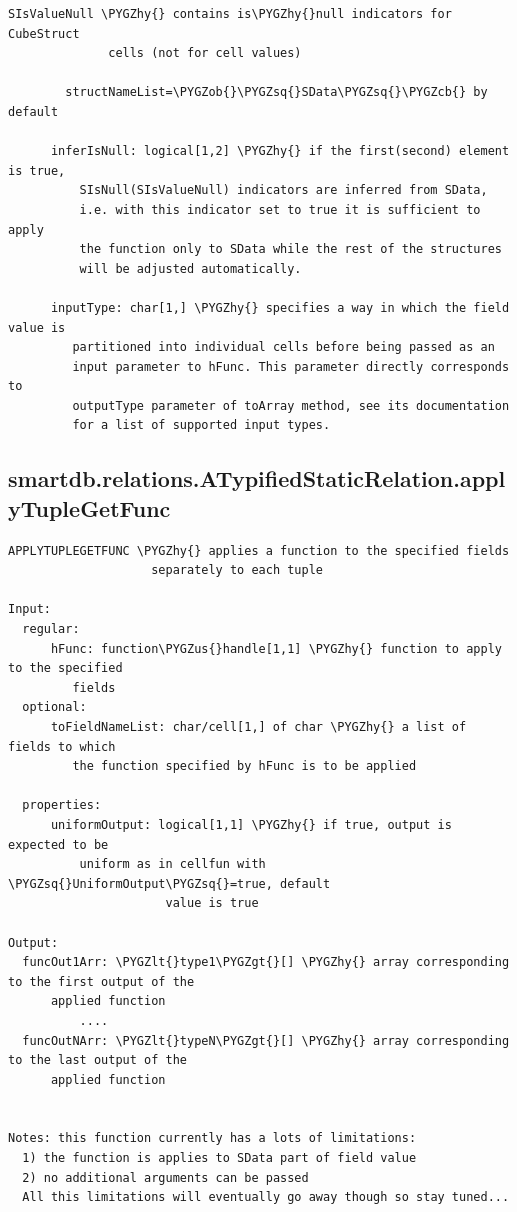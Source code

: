 \documentclass[letterpaper,10pt,english]{sphinxmanual}
\def\PYGZus{\char`\_}
\def\PYGZob{\char`\{}
\def\PYGZcb{\char`\}}
\def\PYGZlt{\char`\<}
\def\PYGZgt{\char`\>}
\def\PYGZhy{\char`\-}
\def\PYGZsq{\char`\'}
\begin{document}
\begin{Verbatim}[commandchars=\\\{\}]
           SIsValueNull \PYGZhy{} contains is\PYGZhy{}null indicators for CubeStruct
              cells (not for cell values)

        structNameList=\PYGZob{}\PYGZsq{}SData\PYGZsq{}\PYGZcb{} by default

      inferIsNull: logical[1,2] \PYGZhy{} if the first(second) element is true,
          SIsNull(SIsValueNull) indicators are inferred from SData,
          i.e. with this indicator set to true it is sufficient to apply
          the function only to SData while the rest of the structures
          will be adjusted automatically.

      inputType: char[1,] \PYGZhy{} specifies a way in which the field value is
         partitioned into individual cells before being passed as an
         input parameter to hFunc. This parameter directly corresponds to
         outputType parameter of toArray method, see its documentation
         for a list of supported input types.
\end{Verbatim}


\subsection{smartdb.relations.ATypifiedStaticRelation.applyTupleGetFunc}
\label{chap_functions:smartdb-relations-atypifiedstaticrelation-applytuplegetfunc}
\begin{Verbatim}[commandchars=\\\{\}]
APPLYTUPLEGETFUNC \PYGZhy{} applies a function to the specified fields
                    separately to each tuple

Input:
  regular:
      hFunc: function\PYGZus{}handle[1,1] \PYGZhy{} function to apply to the specified
         fields
  optional:
      toFieldNameList: char/cell[1,] of char \PYGZhy{} a list of fields to which
         the function specified by hFunc is to be applied

  properties:
      uniformOutput: logical[1,1] \PYGZhy{} if true, output is expected to be
          uniform as in cellfun with \PYGZsq{}UniformOutput\PYGZsq{}=true, default
                      value is true

Output:
  funcOut1Arr: \PYGZlt{}type1\PYGZgt{}[] \PYGZhy{} array corresponding to the first output of the
      applied function
          ....
  funcOutNArr: \PYGZlt{}typeN\PYGZgt{}[] \PYGZhy{} array corresponding to the last output of the
      applied function


Notes: this function currently has a lots of limitations:
  1) the function is applies to SData part of field value
  2) no additional arguments can be passed
  All this limitations will eventually go away though so stay tuned...
\end{Verbatim}
\end{document}
